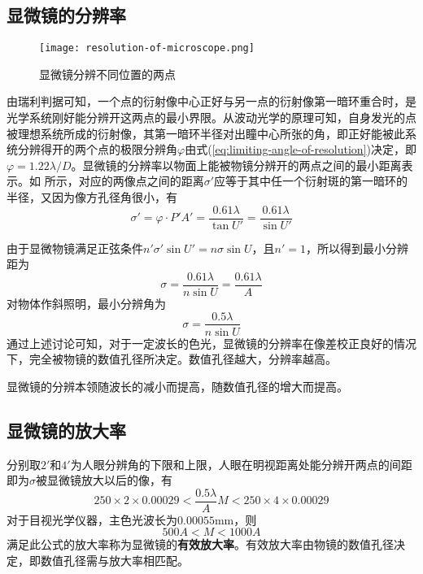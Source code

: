 \documentclass[cn,10pt,chinesefont=founder,math=newtx,cite=super,twoside]{elegantbook}
\begin{document}
\subsection{显微镜的分辨率}

\begin{figure}[htbp]
	\centering
	\texttt{[image: resolution-of-microscope.png]}
	\caption{显微镜分辨不同位置的两点}
	\label{fig:resolution-of-microscope}
\end{figure}

由瑞利判据可知，一个点的衍射像中心正好与另一点的衍射像第一暗环重合时，是光学系统刚好能分辨开这两点的最小界限。从波动光学的原理可知，自身发光的点被理想系统所成的衍射像，其第一暗环半径对出瞳中心所张的角，即正好能被此系统分辨得开的两个点的极限分辨角$\varphi$由式(\ref{eq:limiting-angle-of-resolution})决定，即$\varphi=1.22\lambda/D$。显微镜的分辨率以物面上能被物镜分辨开的两点之间的最小距离表示。如 所示，对应的两像点之间的距离$\sigma'$应等于其中任一个衍射斑的第一暗环的半径，又因为像方孔径角很小，有
\begin{equation}
\sigma'=\varphi\cdot P'A'=\frac{0.61\lambda}{\tan U'}=\frac{0.61\lambda}{\sin U'}
\end{equation}

由于显微物镜满足正弦条件$n'\sigma'\sin U'=n\sigma\sin U$，且$n'=1$，所以得到最小分辨距为
\begin{equation}
\sigma=\frac{0.61\lambda}{n\sin U}=\frac{0.61\lambda}{A}
\end{equation}
对物体作斜照明，最小分辨角为
\begin{equation}
\sigma=\frac{0.5\lambda}{n\sin U}
\end{equation}
通过上述讨论可知，对于一定波长的色光，显微镜的分辨率在像差校正良好的情况下，完全被物镜的数值孔径所决定。数值孔径越大，分辨率越高。
\begin{property}
	显微镜的分辨本领随波长的减小而提高，随数值孔径的增大而提高。
\end{property}

\subsection{显微镜的放大率}
分别取$2'$和$4'$为人眼分辨角的下限和上限，人眼在明视距离处能分辨开两点的间距即为$\sigma$被显微镜放大以后的像，有
\begin{equation}
250\times2\times0.00029<\frac{0.5\lambda}{A}M<250\times4\times0.00029
\end{equation}
对于目视光学仪器，主色光波长为$0.00055\mathrm{mm}$，则
\begin{equation}
500A<M<1000A
\end{equation}
满足此公式的放大率称为显微镜的\textbf{有效放大率}。有效放大率由物镜的数值孔径决定，即数值孔径需与放大率相匹配。
\end{document}
